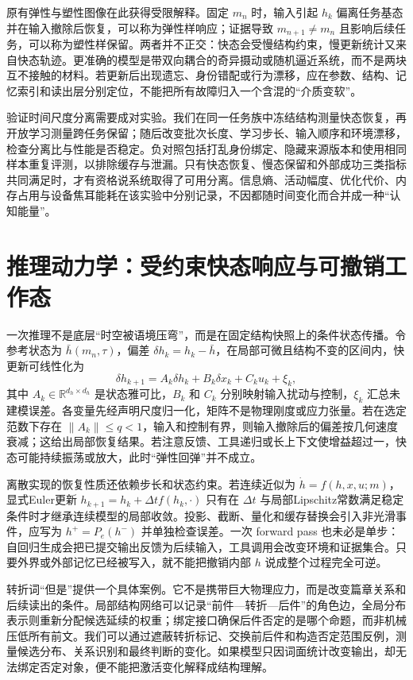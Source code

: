 原有弹性与塑性图像在此获得受限解释。固定 $m_n$ 时，输入引起 $h_k$ 偏离任务基态并在输入撤除后恢复，可以称为弹性样响应；证据导致 $m_{n+1}\neq m_n$ 且影响后续任务，可以称为塑性样保留。两者并不正交：快态会受慢结构约束，慢更新统计又来自快态轨迹。更准确的模型是带双向耦合的奇异摄动或随机逼近系统，而不是两块互不接触的材料。若更新后出现遗忘、身份错配或行为漂移，应在参数、结构、记忆索引和读出层分别定位，不能把所有故障归入一个含混的“介质变软”。

验证时间尺度分离需要成对实验。我们在同一任务族中冻结结构测量快态恢复，再开放学习测量跨任务保留；随后改变批次长度、学习步长、输入顺序和环境漂移，检查分离比与性能是否稳定。负对照包括打乱身份绑定、隐藏来源版本和使用相同样本重复评测，以排除缓存与泄漏。只有快态恢复、慢态保留和外部成功三类指标共同满足时，才有资格说系统取得了可用分离。信息熵、活动幅度、优化代价、内存占用与设备焦耳能耗在该实验中分别记录，不因都随时间变化而合并成一种“认知能量”。

\section{推理动力学：受约束快态响应与可撤销工作态}
\label{sec:section_3688}

一次推理不是底层“时空被语境压弯”，而是在固定结构快照上的条件状态传播。令参考状态为 $\bar h(m_n,\tau)$，偏差 $\delta h_k=h_k-\bar h$，在局部可微且结构不变的区间内，快更新可线性化为
\[
\delta h_{k+1}=A_k\delta h_k+B_k\delta x_k+C_k u_k+\xi_k,
\]
其中 $A_k\in\mathbb R^{d_h\times d_h}$ 是状态雅可比，$B_k$ 和 $C_k$ 分别映射输入扰动与控制，$\xi_k$ 汇总未建模误差。各变量先经声明尺度归一化，矩阵不是物理刚度或应力张量。若在选定范数下存在 $\|A_k\|\leq q<1$，输入和控制有界，则输入撤除后的偏差按几何速度衰减；这给出局部恢复结果。若注意反馈、工具递归或长上下文使增益超过一，快态可能持续振荡或放大，此时“弹性回弹”并不成立。

离散实现的恢复性质还依赖步长和状态约束。若连续近似为 $\dot h=f(h,x,u;m)$，显式Euler更新 $h_{k+1}=h_k+\Delta t f(h_k,\cdot)$ 只有在 $\Delta t$ 与局部Lipschitz常数满足稳定条件时才继承连续模型的局部收敛。投影、截断、量化和缓存替换会引入非光滑事件，应写为 $h^+=P_e(h^-)$ 并单独检查误差。一次 forward pass 也未必是单步：自回归生成会把已提交输出反馈为后续输入，工具调用会改变环境和证据集合。只要外界或外部记忆已经被写入，就不能把撤销内部 $h$ 说成整个过程完全可逆。

转折词“但是”提供一个具体案例。它不是携带巨大物理应力，而是改变篇章关系和后续读出的条件。局部结构网络可以记录“前件—转折—后件”的角色边，全局分布表示则重新分配候选延续的权重；绑定接口确保后件否定的是哪个命题，而非机械压低所有前文。我们可以通过遮蔽转折标记、交换前后件和构造否定范围反例，测量候选分布、关系识别和最终判断的变化。如果模型只因词面统计改变输出，却无法绑定否定对象，便不能把激活变化解释成结构理解。

